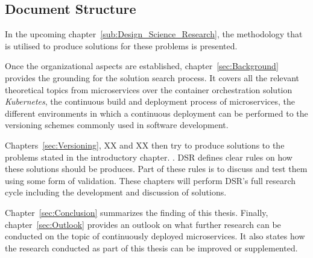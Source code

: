 
\subsection{Document Structure}%
\label{sub:Document Structure}

In the upcoming chapter~\ref{sub:Design_Science_Research}, the methodology that
is utilised to produce solutions for these problems is presented.

Once the organizational aspects are established, chapter~\ref{sec:Background}
provides the grounding for the solution search process. It covers all the
relevant theoretical topics from microservices over the container orchestration
solution \textit{Kubernetes}, the continuous build and deployment process of
microservices, the different environments in which a continuous deployment can
be performed to the versioning schemes commonly used in software development.

 Chapters~\ref{sec:Versioning}, XX and XX then
try to produce solutions to the problems stated in the introductory chapter.
. \acf{DSR} defines
clear rules on how these solutions should be produces. Part of these rules is
to discuss and test them using some form of validation. These chapters will
perform \acs{DSR}'s full research cycle including the development and
discussion of solutions.

Chapter~\ref{sec:Conclusion} summarizes the finding of this thesis. Finally,
chapter~\ref{sec:Outlook} provides an outlook on what further research can be
conducted on the topic of continuously deployed microservices. It also states
how the research conducted as part of this thesis can be improved or
supplemented.
